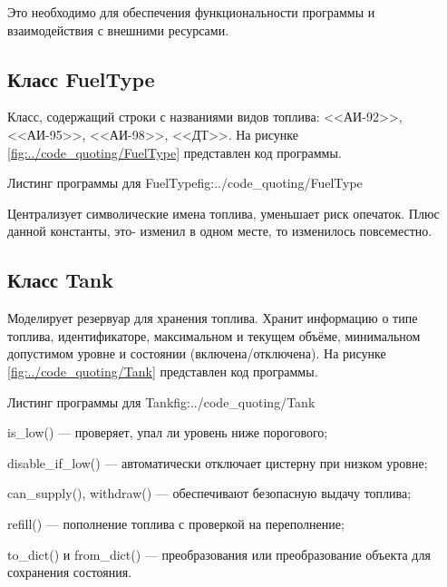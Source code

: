 \documentclass{vvsu}
\begin{document}
  Это необходимо для обеспечения функциональности программы и взаимодействия с внешними ресурсами.


\subsection{Класс FuelType}
  Класс, содержащий строки с названиями видов топлива: <<АИ-92>>, <<АИ-95>>, <<АИ-98>>, <<ДТ>>.
На рисунке \ref{fig:../code_quoting/FuelType} представлен код программы.

\begin{vvsu_figure}{Листинг программы для FuelType}{fig:../code_quoting/FuelType}
  \begin{minipage}{.75\textwidth}
    
  \end{minipage}
\end{vvsu_figure}
  
  Централизует символические имена топлива, уменьшает риск опечаток. Плюс данной константы, это- изменил в одном месте, то изменилось повсеместно.


\subsection{Класс Tank}
  Моделирует резервуар для хранения топлива. Хранит информацию о типе топлива, идентификаторе, максимальном и текущем объёме, минимальном допустимом уровне и состоянии (включена/отключена).
На рисунке \ref{fig:../code_quoting/Tank} представлен код программы.

\begin{vvsu_figure}{Листинг программы для Tank}{fig:../code_quoting/Tank}
  \begin{minipage}{.75\textwidth}
    
  \end{minipage}
\end{vvsu_figure}

\begin{vvsu_itemize}
  \item is\_low() — проверяет, упал ли уровень ниже порогового;
  \item disable\_if\_low() — автоматически отключает цистерну при низком уровне;
  \item can\_supply(), withdraw() — обеспечивают безопасную выдачу топлива;
  \item refill() — пополнение топлива с проверкой на переполнение;
  \item to\_dict() и from\_dict() — преобразования или преобразование объекта для сохранения состояния.
\end{vvsu_itemize}
  
\end{document}
